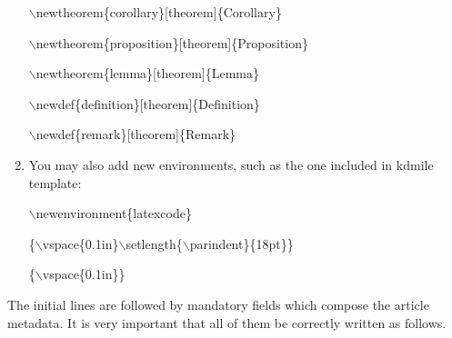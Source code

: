 \documentclass[kdmile,a4paper]{kdmile} %
\newenvironment{latexcode}
{\ttfamily\vspace{0.1in}\setlength{\parindent}{18pt}}
{\vspace{0.1in}}
\begin{document}
\begin{enumerate}
\begin{latexcode}
			$\backslash$newtheorem\{corollary\}[theorem]\{Corollary\}
			
			$\backslash$newtheorem\{proposition\}[theorem]\{Proposition\}
			
			$\backslash$newtheorem\{lemma\}[theorem]\{Lemma\}
			
			$\backslash$newdef\{definition\}[theorem]\{Definition\}
			
			$\backslash$newdef\{remark\}[theorem]\{Remark\}
			\end{latexcode}
			
	\item You may also add new environments, such as the one included in kdmile template:

		\begin{latexcode} 
				$\backslash$newenvironment\{latexcode\} 
				
		    \{$\backslash$vspace\{0.1in\}$\backslash$setlength\{$\backslash$parindent\}\{18pt\}\} 
		    
				\{$\backslash$vspace\{0.1in\}\}
		\end{latexcode}
		 		
\end{enumerate}


The initial lines are followed by mandatory fields which compose the article metadata. It is very important that all of them be correctly written as follows.
\end{document}
